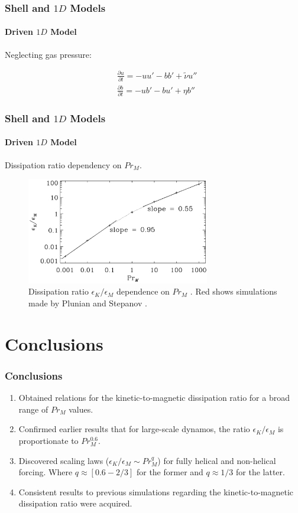 \documentclass{beamer}
\begin{document}
\begin{frame}
 \frametitle{Shell and $1D$ Models}
 \framesubtitle{Driven $1D$ Model}
 
 Neglecting gas pressure:
 
 \begin{align}
  &\frac{\partial u}{\partial t} = -u u' - b b' + \tilde{\nu} u''  \nonumber \\
  &\frac{\partial b}{\partial t} = - u b' - b u' + \eta b'' \nonumber
 \end{align}

 
\end{frame}

\begin{frame}
 \frametitle{Shell and $1D$ Models}
 \framesubtitle{Driven $1D$ Model}
 
 Dissipation ratio dependency on $Pr_M$.
 
 \begin{figure}[t]
  \includegraphics[width=8cm]{img/dissipation_ratio3}
  \caption{Dissipation ratio $\epsilon_K/\epsilon_M$ dependence on $Pr_M$ \cite{brandenburg2014magnetic}. Red shows simulations made by Plunian and Stepanov \cite{plunian2010cascades}.}
  \centering
 \end{figure}
 
\end{frame}

\section{Conclusions}

\begin{frame}
 \frametitle{Conclusions}
 
 \begin{enumerate}
  \item<1-> Obtained relations for the kinetic-to-magnetic dissipation ratio for a broad range of $Pr_M$ values.
  \item<2-> Confirmed  earlier results that for large-scale dynamos, the ratio $\epsilon_K / \epsilon_M$ is proportionate to $Pr_M^{0.6}$.
  \item<3-> Discovered scaling laws ($\epsilon_K / \epsilon_M \sim Pr_M^q$) for fully helical and non-helical forcing. Where $q\approx [0.6 - 2/3]$ for the former and $q\approx 1/3$ for the latter.
  \item<4-> Consistent results to previous simulations regarding the kinetic-to-magnetic dissipation ratio were acquired.
 \end{enumerate}
 
\end{frame}
\end{document}
